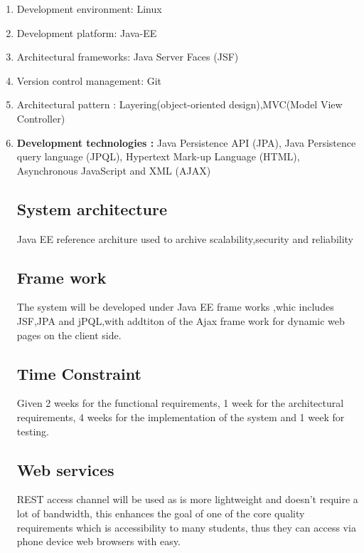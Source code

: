  
%

	\begin{enumerate}
	
	
		
		\item Development environment:  Linux
		\item Development platform:  Java-EE 
		\item	Architectural frameworks: Java Server Faces (JSF)
		\item Version control management: Git
		\item Architectural pattern : Layering(object-oriented design),MVC(Model View Controller)
		\item \textbf{ Development technologies :}
			 Java Persistence API (JPA),
			 Java Persistence query language (JPQL),
			  Hypertext  Mark-up Language (HTML),
			 Asynchronous JavaScript and XML (AJAX)
			
			

		
		

	
\subsection*{ System architecture} 
Java EE reference architure used to archive scalability,security and reliability 

\subsection*{ Frame work}
The system will be developed under Java EE frame works ,whic includes JSF,JPA and jPQL,with addtiton of the Ajax frame work for dynamic web pages on the client side.

\subsection*{ Time Constraint} 
Given 2 weeks for the functional requirements, 1 week for the architectural requirements, 4 weeks for the implementation of the system and 1 week for testing.

\subsection*{Web services}
REST access channel will be used as is more lightweight and doesn’t require a lot of bandwidth, this enhances the goal of one of the core quality requirements which is accessibility to many students, thus they can access via phone device web browsers with easy.


\end{enumerate}
